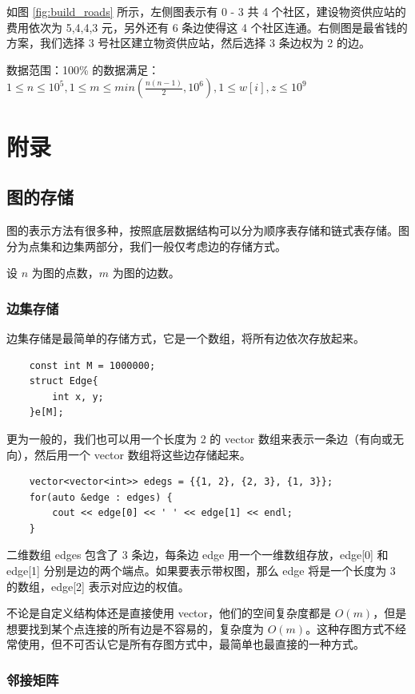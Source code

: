\documentclass[12pt,a4paper]{article}
\begin{document}
如图 \ref{fig:build_roads} 所示，左侧图表示有 0 - 3 共 4 个社区，建设物资供应站的费用依次为 5,4,4,3 元，另外还有 6 条边使得这 4 个社区连通。右侧图是最省钱的方案，我们选择 3 号社区建立物资供应站，然后选择 3 条边权为 2 的边。


数据范围：100\% 的数据满足：$1\le n \le 10^5, 1 \le m \le min(\frac{n(n-1)}{2}, 10^6), 1 \le w[i], z \le 10^9$

\section{附录}

\subsection{图的存储}

图的表示方法有很多种，按照底层数据结构可以分为顺序表存储和链式表存储。图分为点集和边集两部分，我们一般仅考虑边的存储方式。

设 $n$ 为图的点数，$m$ 为图的边数。

\subsubsection{边集存储}

边集存储是最简单的存储方式，它是一个数组，将所有边依次存放起来。
\begin{lstlisting}
    const int M = 1000000;
    struct Edge{
        int x, y;
    }e[M];
\end{lstlisting}

更为一般的，我们也可以用一个长度为 2 的 vector 数组来表示一条边（有向或无向），然后用一个 vector 数组将这些边存储起来。
\begin{lstlisting}
    vector<vector<int>> edegs = {{1, 2}, {2, 3}, {1, 3}};
    for(auto &edge : edges) {
        cout << edge[0] << ' ' << edge[1] << endl;
    }
\end{lstlisting}

二维数组 edges 包含了 3 条边，每条边 edge 用一个一维数组存放，edge[0] 和 edge[1] 分别是边的两个端点。如果要表示带权图，那么 edge 将是一个长度为 3 的数组，edge[2] 表示对应边的权值。

不论是自定义结构体还是直接使用 vector，他们的空间复杂度都是 $O(m)$，但是想要找到某个点连接的所有边是不容易的，复杂度为 $O(m)$。这种存图方式不经常使用，但不可否认它是所有存图方式中，最简单也最直接的一种方式。

\subsubsection{邻接矩阵}
\end{document}
